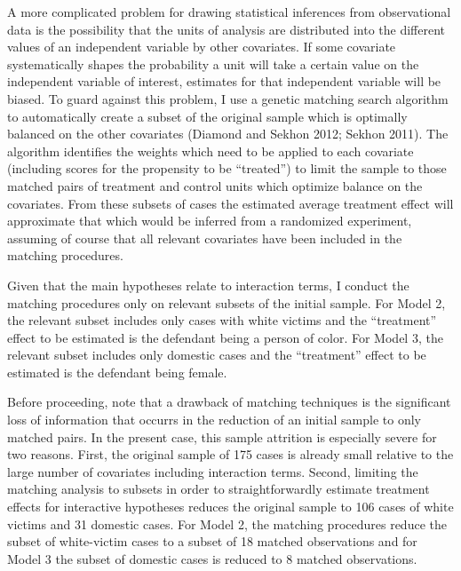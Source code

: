 \documentclass[12pt,article]{article}
\begin{document}
A more complicated problem for drawing statistical inferences from
observational data is the possibility that the units of analysis are
distributed into the different values of an independent variable by
other covariates. If some covariate systematically shapes the
probability a unit will take a certain value on the independent variable
of interest, estimates for that independent variable will be biased. To
guard against this problem, I use a genetic matching search algorithm to
automatically create a subset of the original sample which is optimally
balanced on the other covariates (Diamond and Sekhon 2012; Sekhon 2011).
The algorithm identifies the weights which need to be applied to each
covariate (including scores for the propensity to be ``treated'') to
limit the sample to those matched pairs of treatment and control units
which optimize balance on the covariates. From these subsets of cases
the estimated average treatment effect will approximate that which would
be inferred from a randomized experiment, assuming of course that all
relevant covariates have been included in the matching procedures.

Given that the main hypotheses relate to interaction terms, I conduct
the matching procedures only on relevant subsets of the initial sample.
For Model 2, the relevant subset includes only cases with white victims
and the ``treatment'' effect to be estimated is the defendant being a
person of color. For Model 3, the relevant subset includes only domestic
cases and the ``treatment'' effect to be estimated is the defendant
being female.

Before proceeding, note that a drawback of matching techniques is the
significant loss of information that occurrs in the reduction of an
initial sample to only matched pairs. In the present case, this sample
attrition is especially severe for two reasons. First, the original
sample of 175 cases is already small relative to the large number of
covariates including interaction terms. Second, limiting the matching
analysis to subsets in order to straightforwardly estimate treatment
effects for interactive hypotheses reduces the original sample to 106
cases of white victims and 31 domestic cases. For Model 2, the matching
procedures reduce the subset of white-victim cases to a subset of 18
matched observations and for Model 3 the subset of domestic cases is
reduced to 8 matched observations.
\end{document}

